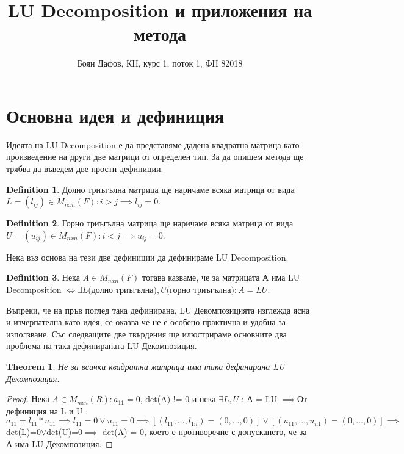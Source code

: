 \documentclass{article}
\begin{document}
\title{LU Decomposition и приложения на метода}
\author{Боян Дафов, КН, курс 1, поток 1, ФН 82018}
\maketitle
\newpage

\newtheorem{theorem}{Theorem}

\theoremstyle{definition}
\newtheorem{definition}{Definition}[section]

\newtheorem{lemma}[theorem]{Lemma}

\section{Основна идея и дефиниция}
Идеята на LU Decomposition е да представяме дадена квадратна матрица като произведение на други две матрици от определен тип. За да опишем метода ще трябва да въведем две прости дефиниции.

\theoremstyle{definition}
\begin{definition}
Долно триъгълна матрица ще наричаме всяка матрица от вида $L = (l_{ij}) \in M_{nxn} (F) : i > j \implies l_{ij} = 0 $. 
\end{definition}

\theoremstyle{definition}
\begin{definition}
Горно триъгълна матрица ще наричаме всяка матрица от вида $U = (u_{ij}) \in M_{nxn} (F) : i < j \implies u_{ij} = 0 $. 
\end{definition}

Нека въз основа на тези две дефиниции да дефинираме LU Decomposition.
\theoremstyle{definition}
\begin{definition}
Нека $A \in M_{nxn}(F)$ тогава казваме, че за матрицата А има LU Decomposition $\Leftrightarrow \exists L ($долно триъгълна$), U ($горно триъгълна$) : A = LU$.
\end{definition}

Въпреки, че на пръв поглед така дефинирана, LU Декомпозицията изглежда ясна и изчерпателна като идея, се оказва че не е особено практична и удобна за използване. Със следващите две твърдения ще илюстрираме основните два проблема на така дефинираната LU Декомпозиция. 
\begin{theorem}
Не за всички квадратни матрици има така дефинирана LU Декомпозиция.
\end{theorem}
\begin{proof}
Нека $A \in M_{nxn}(R) : a_{11} = 0$, det(A) != 0 и нека $\exists  L, U$ : А = LU $\implies $От дефиниция на L и U : $a_{11} = l_{11} * u_{11} \implies l_{11} = 0 \lor u_{11} = 0 \implies [(l_{11},\dots, l_{1n}) = (0, \dots, 0)] \lor [(u_{11},\dots, u_{n1}) = (0, \dots, 0)] \implies $det(L)=0$ \lor $det(U)=0$ \implies $ det(A) = 0, което е нротиворечие с допускането, че за А има LU Декомпозиция.
\end{proof}
\end{document}
